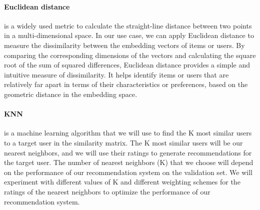 \paragraph{Euclidean distance} is a widely used metric to calculate the straight-line distance between two points in a multi-dimensional space. In our use case, we can apply Euclidean distance to measure the dissimilarity between the embedding vectors of items or users. By comparing the corresponding dimensions of the vectors and calculating the square root of the sum of squared differences, Euclidean distance provides a simple and intuitive measure of dissimilarity. It helps identify items or users that are relatively far apart in terms of their characteristics or preferences, based on the geometric distance in the embedding space.


\paragraph{KNN} is a machine learning algorithm that we will use to find the K most similar users to a target user in the similarity matrix. The K most similar users will be our nearest neighbors, and we will use their ratings to generate recommendations for the target user. The number of nearest neighbors (K) that we choose will depend on the performance of our recommendation system on the validation set. We will experiment with different values of K and different weighting schemes for the ratings of the nearest neighbors to optimize the performance of our recommendation system.  \\


